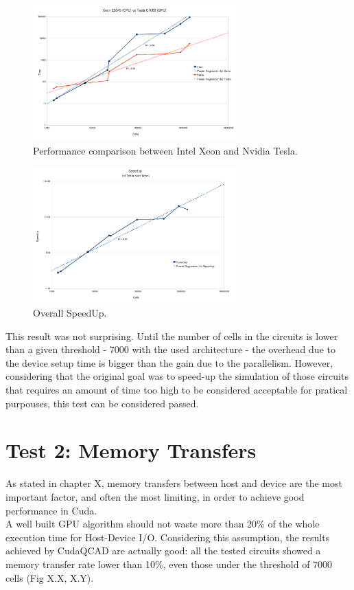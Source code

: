 \begin{figure}[h!bt]
	\centerline{\includegraphics[width=0.7\textwidth]{img/xeonvstesla.png}}
	\caption{Performance comparison between Intel Xeon and Nvidia Tesla.}
	\label{fig:NvidiaGPUsLogicalOrg}
\end{figure}

\begin{figure}[h!bt]
        \centerline{\includegraphics[width=0.7\textwidth]{img/speedup.png}}
        \caption{Overall SpeedUp.}
        \label{fig:NvidiaGPUsLogicalOrg}
\end{figure}

This result was not surprising. Until the number of cells in the circuits is lower than a given threshold - 7000 with the used architecture - the overhead due to the device setup time is bigger than the gain due to the parallelism. However, considering that the original goal was to speed-up the simulation of those circuits that requires an amount of time too high to be considered acceptable for pratical purpouses, this test can be considered passed.

\section{Test 2: Memory Transfers}
As stated in chapter X, memory transfers between host and device are the most important factor, and often the most limiting, in order to achieve good performance in Cuda.\\
A well built GPU algorithm should not waste more than 20\% of the whole execution time for Host-Device I/O. Considering this assumption, the results achieved by CudaQCAD are actually good: all the tested circuits showed a memory transfer rate lower than 10\%, even those under the threshold of 7000 cells (Fig X.X, X.Y).

